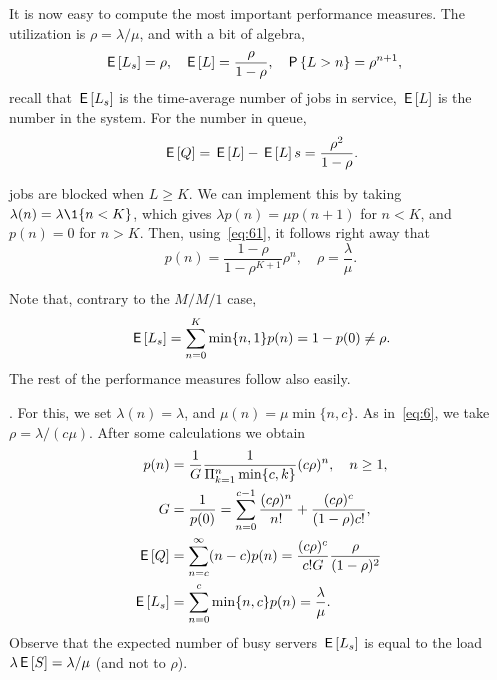 It is now easy to compute the most important performance measures.
The utilization is $\rho=\lambda/\mu$, and with a bit of algebra,
\begin{align}\label{eq:el}
\,\mathsf{E}\left[L_s\right] &= \rho, & \,\mathsf{E}\left[L\right] &= \frac \rho{1-\rho}, & \,\mathsf{P}\left\{L> n\right\} &= \rho^{n+1},
\end{align}
recall that $\,\mathsf{E}\left[L_s\right]$ is the time-average number of jobs in service, $\,\mathsf{E}\left[L\right]$ is the number in the system. For the number in queue,
\begin{equation*}
\,\mathsf{E}\left[Q\right] = \,\mathsf{E}\left[L\right] - \,\mathsf{E}\left[L\right]s = \frac{\rho^2}{1-\rho}.
\end{equation*}


  jobs are blocked when $L\geq K$.
We can implement this by taking $\lambda(n) = \lambda \1{n < K}$, which
gives $\lambda p(n) = \mu p(n+1)$ for $n<K$, and $p(n) = 0$ for $n>K$.
Then, using~\cref{eq:61}, it follows right away  that
 \begin{equation*}
p(n) = \frac{1-\rho}{1-\rho^{K+1}} \rho^n, \quad \rho = \frac{\lambda}{\mu}.
\end{equation*}

Note that, contrary to the $M/M/1$ case,
\begin{equation*}
\,\mathsf{E}\left[L_s\right] = \sum_{n=0}^K \min\{n, 1\} p(n) = 1-p(0) \neq \rho.
\end{equation*}
The rest of the performance measures follow also easily.

.
For this, we set $\lambda(n) = \lambda$, and $\mu(n) = \mu \min\{n, c\}$.
As in~\cref{eq:6}, we take $\rho=\lambda/(c\mu)$.
After some calculations we obtain
\begin{subequations}
\begin{align}
p(n) &= \frac 1 {G} \frac{1}{\Pi_{k=1}^{n}\min\{c, k\}}(c\rho)^{n} , \quad n\geq 1,\label{eq:1}\\
G &= \frac 1{p(0)} = \sum_{n=0}^{c-1} \frac{(c\rho)^n}{n!} + \frac{(c\rho)^c}{(1-\rho)c!}, \label{eq:501}\\
\,\mathsf{E}\left[Q\right] &= \sum_{n=c}^\infty (n-c) p(n) = \frac{(c\rho)^c}{c! G}\frac{\rho}{(1-\rho)^2}\\
\,\mathsf{E}\left[L_s\right] &= \sum_{n=0}^{c}\min\{n,c\} p(n)= \frac{\lambda}\mu.
\end{align}
\end{subequations}
Observe that the expected number of busy servers $\,\mathsf{E}\left[L_s\right]$ is equal to the load $\lambda \,\mathsf{E}\left[S\right]=\lambda/\mu$ (and not to $\rho$).


